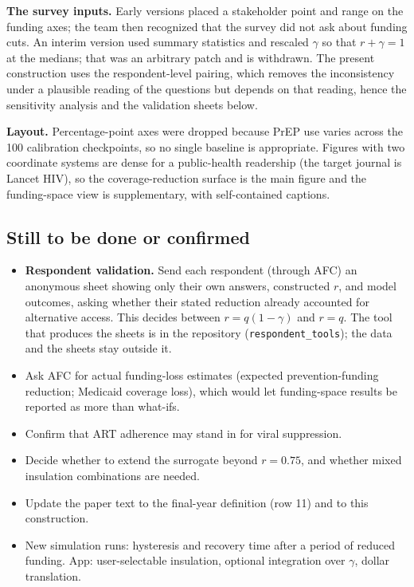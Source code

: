 \documentclass[10pt,a4paper]{article}
\begin{document}
\textbf{The survey inputs.} Early versions placed a stakeholder point and range on the funding axes; the team then recognized that the survey did not ask about funding cuts. An interim version used summary statistics and rescaled $\gamma$ so that $r+\gamma=1$ at the medians; that was an arbitrary patch and is withdrawn. The present construction uses the respondent-level pairing, which removes the inconsistency under a plausible reading of the questions but depends on that reading, hence the sensitivity analysis and the validation sheets below.

\textbf{Layout.} Percentage-point axes were dropped because PrEP use varies across the 100 calibration checkpoints, so no single baseline is appropriate. Figures with two coordinate systems are dense for a public-health readership (the target journal is Lancet HIV), so the coverage-reduction surface is the main figure and the funding-space view is supplementary, with self-contained captions.

\subsection{Still to be done or confirmed}
\begin{itemize}
\item \textbf{Respondent validation.} Send each respondent (through AFC) an anonymous sheet showing only their own answers, constructed $r$, and model outcomes, asking whether their stated reduction already accounted for alternative access. This decides between $r=q(1-\gamma)$ and $r=q$. The tool that produces the sheets is in the repository (\texttt{respondent\_tools}); the data and the sheets stay outside it.
\item Ask AFC for actual funding-loss estimates (expected prevention-funding reduction; Medicaid coverage loss), which would let funding-space results be reported as more than what-ifs.
\item Confirm that ART adherence may stand in for viral suppression.
\item Decide whether to extend the surrogate beyond $r=0.75$, and whether mixed insulation combinations are needed.
\item Update the paper text to the final-year definition (row 11) and to this construction.
\item New simulation runs: hysteresis and recovery time after a period of reduced funding. App: user-selectable insulation, optional integration over $\gamma$, dollar translation.
\end{itemize}
\end{document}
